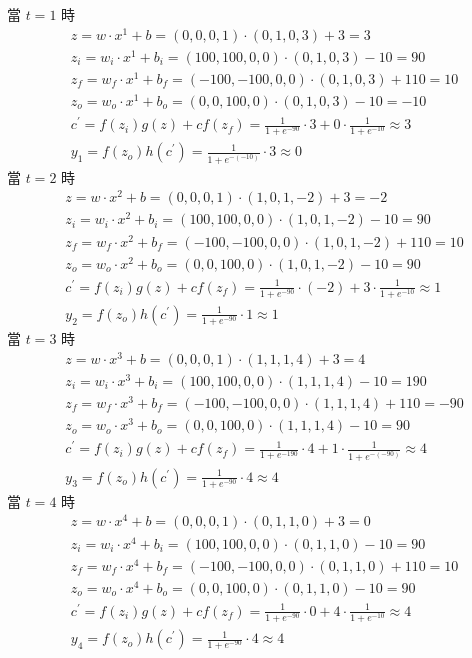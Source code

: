 \documentclass{article}
\begin{document}
\noindent
當 $t = 1$ 時
\begin{align*}
    &z = w \cdot x^1 + b = (0, 0, 0, 1) \cdot (0, 1, 0, 3) + 3 = 3\\
    &z_i = w_i \cdot x^1 + b_i = (100, 100, 0, 0) \cdot (0, 1, 0, 3) - 10 = 90\\
    &z_f = w_f \cdot x^1 + b_f = (-100, -100, 0, 0) \cdot (0, 1, 0, 3) + 110 = 10\\
    &z_o = w_o \cdot x^1 + b_o = (0, 0, 100, 0) \cdot (0, 1, 0, 3) - 10 = -10\\
    &c^\prime = f(z_i) g(z) + c f(z_f) = \frac{1}{1 + e^{-90}} \cdot 3 + 0 \cdot \frac{1}{1 + e^{-10}} \approx 3\\
    &y_1 = f(z_o) h(c^\prime) = \frac{1}{1 + e^{-(-10)}} \cdot 3 \approx 0
\end{align*}
當 $t = 2$ 時
\begin{align*}
    &z = w \cdot x^2 + b = (0, 0, 0, 1) \cdot (1, 0, 1, -2) + 3 = -2\\
    &z_i = w_i \cdot x^2 + b_i = (100, 100, 0, 0) \cdot (1, 0, 1, -2) - 10 = 90\\
    &z_f = w_f \cdot x^2 + b_f = (-100, -100, 0, 0) \cdot (1, 0, 1, -2) + 110 = 10\\
    &z_o = w_o \cdot x^2 + b_o = (0, 0, 100, 0) \cdot (1, 0, 1, -2) - 10 = 90\\
    &c^\prime = f(z_i) g(z) + c f(z_f) = \frac{1}{1 + e^{-90}} \cdot (-2) + 3 \cdot \frac{1}{1 + e^{-10}} \approx 1\\
    &y_2 = f(z_o) h(c^\prime) = \frac{1}{1 + e^{-90}} \cdot 1 \approx 1
\end{align*}
當 $t = 3$ 時
\begin{align*}
    &z = w \cdot x^3 + b = (0, 0, 0, 1) \cdot (1, 1, 1, 4) + 3 = 4\\
    &z_i = w_i \cdot x^3 + b_i = (100, 100, 0, 0) \cdot (1, 1, 1, 4) - 10 = 190\\
    &z_f = w_f \cdot x^3 + b_f = (-100, -100, 0, 0) \cdot (1, 1, 1, 4) + 110 = -90\\
    &z_o = w_o \cdot x^3 + b_o = (0, 0, 100, 0) \cdot (1, 1, 1, 4) - 10 = 90\\
    &c^\prime = f(z_i) g(z) + c f(z_f) = \frac{1}{1 + e^{-190}} \cdot 4 + 1 \cdot \frac{1}{1 + e^{-(-90)}} \approx 4\\
    &y_3 = f(z_o) h(c^\prime) = \frac{1}{1 + e^{-90}} \cdot 4 \approx 4
\end{align*}
當 $t = 4$ 時
\begin{align*}
    &z = w \cdot x^4 + b = (0, 0, 0, 1) \cdot (0, 1, 1, 0) + 3 = 0\\
    &z_i = w_i \cdot x^4 + b_i = (100, 100, 0, 0) \cdot (0, 1, 1, 0) - 10 = 90\\
    &z_f = w_f \cdot x^4 + b_f = (-100, -100, 0, 0) \cdot (0, 1, 1, 0) + 110 = 10\\
    &z_o = w_o \cdot x^4 + b_o = (0, 0, 100, 0) \cdot (0, 1, 1, 0) - 10 = 90\\
    &c^\prime = f(z_i) g(z) + c f(z_f) = \frac{1}{1 + e^{-90}} \cdot 0 + 4 \cdot \frac{1}{1 + e^{-10}} \approx 4\\
    &y_4 = f(z_o) h(c^\prime) = \frac{1}{1 + e^{-90}} \cdot 4 \approx 4
\end{align*}
\end{document}

